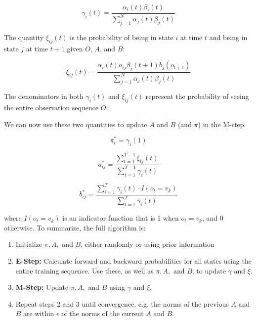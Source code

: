 \documentclass[14pt]{article}
\begin{document}
$$\gamma_i(t) = \frac{\alpha_i(t)\beta_i(t)}{\sum_{j=1}^N \alpha_j(t)\beta_j(t)}$$

The quantity $\xi_{ij}(t)$ is the probability of being in state $i$ at time $t$ and being in state $j$ at time $t+1$ given $O$, $A$, and $B$:

$$\xi_{ij}(t) = \frac{\alpha_i(t)a_{ij}\beta_j(t+1)b_j(o_{t+1})}{\sum_{j=1}^N \alpha_j(t)\beta_j(t)}$$

The denominators in both $\gamma_i(t)$ and $\xi_{ij}(t)$ represent the probability of seeing the entire observation sequence $O$.

We can now use these two quantities to update $A$ and $B$ (and $\pi$) in the M-step.

$$\pi^*_i = \gamma_i(1)$$

$$a^*_{ij} = \frac{\sum_{t=1}^{T-1}\xi_{ij}(t)}{\sum_{t=1}^{T-1}\gamma_i(t)}$$

$$b^*_{ij} = \frac{\sum_{i=1}^T \gamma_i(t)\cdot I(o_t = v_k)}{\sum_{t=1}^T \gamma_i(t)}$$

where $I(o_t = v_k)$ is an indicator function that is 1 when $o_t = v_k$, and 0 otherwise.  To summarize, the full algorithm is:
\begin{enumerate}
\item Initialize $\pi, A,$ and $B$, either randomly or using prior information
\item \textbf{E-Step:} Calculate forward and backward probabilities for all states using the entire training sequence.  Use these, as well as $\pi, A,$ and $B$, to update $\gamma$ and $\xi$.
\item \textbf{M-Step:} Update $\pi, A,$ and $B$ using $\gamma$ and $\xi$.
\item Repeat steps 2 and 3 until convergence, e.g. the norms of the previous $A$ and $B$ are within $\epsilon$ of the norms of the current $A$ and $B$.
\end{enumerate}
\end{document}
